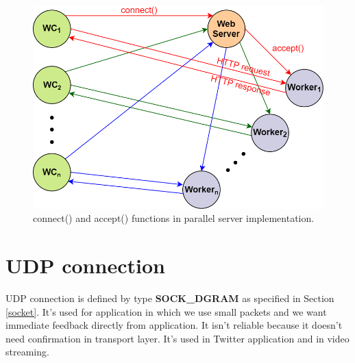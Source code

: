\begin{figure}[h]
\centering
\includegraphics[scale=0.4]{Images/NetworkC/connect_accept}
\caption{\footnotesize{connect() and accept() functions in parallel server implementation.}}\label{connect_accept}
\end{figure}
\clearpage
\section{UDP connection}
UDP connection is defined by type \textbf{SOCK\_DGRAM} as specified in Section \ref{socket}. It's used for application in which we use small packets and we want immediate feedback directly from application. It isn't reliable because it doesn't need confirmation in transport layer. It's used in Twitter application and in video streaming.